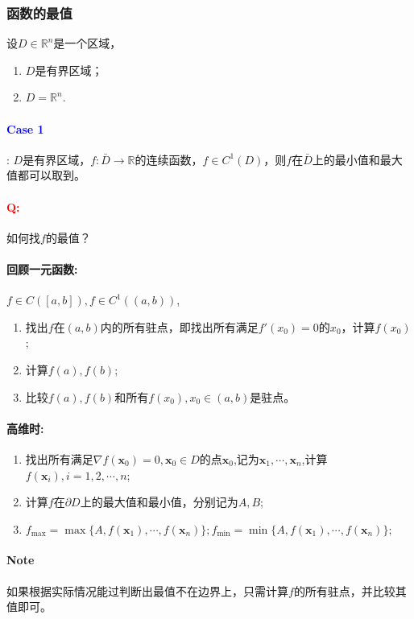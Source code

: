 \documentclass[UTF8]{ctexart}
\newcommand{\x}{\boldsymbol{x}}
\begin{document}
    \subsubsection{函数的最值}
    设$D\in\mathbb{R}^n$是一个区域，
    \begin{enumerate}[{Case} 1{:}]
        \item $D$是有界区域；
        \item $D=\mathbb{R}^n$.
    \end{enumerate}
    \vspace{2ex}
    \paragraph{\textcolor{blue}{Case 1}}: $D$是有界区域，$f:\bar{D}\to \mathbb{R}$的连续函数，$f\in C^1(D)$，则$f$在$\bar{D}$上的最小值和最大值都可以取到。
    \paragraph{\textcolor{red}{Q:}}如何找$f$的最值？
    \paragraph{回顾一元函数:}$f\in C([a,b]),f\in C^1((a,b))$,
    \begin{enumerate}[{Step} 1{:}]
        \item 找出$f$在$(a,b)$内的所有驻点，即找出所有满足$f'(x_0)=0$的$x_0$，计算$f(x_0)$;
        \item 计算$f(a),f(b)$;
        \item 比较$f(a),f(b)$和所有$f(x_0),x_0\in(a,b)$是驻点。
    \end{enumerate}
    \paragraph{高维时:}
    \begin{enumerate}[{Step} 1{:}]
        \item 找出所有满足$\nabla f(\x_0)=0,\x_0\in D$的点$\x_0$,记为$\x_1,\cdots,\x_n$,计算$f(\x_i),i=1,2,\cdots,n$;
        \item 计算$f$在$\partial D$上的最大值和最小值，分别记为$A,B$;
        \item $f_{\max} =\max\{A,f(\x_1),\cdots,f(\x_n)\};f_{\min} =\min\{A,f(\x_1),\cdots,f(\x_n)\};$
    \end{enumerate}
    \paragraph{\colorbox{orange!75}{Note}}如果根据实际情况能过判断出最值不在边界上，只需计算$f$的所有驻点，并比较其值即可。
    
\end{document}
